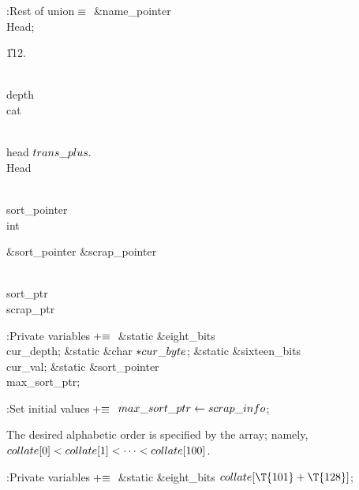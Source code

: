 \Y\B\4:Rest of  union\X${}\equiv{}$\6
\&{name\_pointer} \\{Head};\par
\U112.\fi

\B\D\\{depth}\5
\\{cat}\par
\B\4\D\\{head}\5
$\\{trans\_plus}.{}$\\{Head}\par
\B\F\\{sort\_pointer}\5
\\{int}\par
\B\4\D\&{sort\_pointer}\5
\&{scrap\_pointer}\par
\B\4\D\\{sort\_ptr}\5
\\{scrap\_ptr}\par
\Y\B\4:Private variables\X${}\mathrel+\equiv{}$\6
\&{static} \&{eight\_bits} \\{cur\_depth};\6
\&{static} \&{char} ${}{*}\\{cur\_byte}{}$;\6
\&{static} \&{sixteen\_bits} \\{cur\_val};\6
\&{static} \&{sort\_pointer} \\{max\_sort\_ptr};\par
\fi

\B{}:Set initial values\X${}\mathrel+\equiv{}$\6
$\\{max\_sort\_ptr}\leftarrow\\{scrap\_info}{}$;\par
\fi

The desired alphabetic order is specified by the  array;
namely,
$\relax{\\{collate}}[0]<\relax{\\{collate}}[1]<\cdots<\relax{\\{collate}}[100]$.

\Y\B\4:Private variables\X${}\mathrel+\equiv{}$\6
\&{static} \&{eight\_bits} ${}\\{collate}[\T{101}+\T{128}]{}$;\par
\fi

